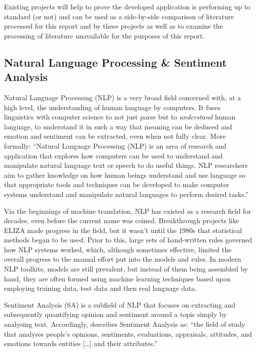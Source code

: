 \documentclass{article}
\begin{document}
        Existing projects will help to prove the developed application is performing up to standard (or not) and can be used as a side-by-side comparison of literature processed for this report and by these projects as well as to examine the processing of literature unavailable for the purposes of this report.
    \subsection{Natural Language Processing \& Sentiment Analysis}
        Natural Language Processing (NLP) is a very broad field concerned with, at a high level, the understanding of human language by computers. It fuses linguistics with computer science to not just parse but to \textit{understand} human language, to understand it in such a way that meaning can be deduced and emotion and sentiment can be extracted, even when not fully clear. More formally: ``Natural Language Processing (NLP) is an area of research and application that explores how computers can be used to understand and manipulate natural language text or speech to do useful things. NLP researchers aim to gather knowledge on how human beings understand and use language so that appropriate tools and techniques can be developed to make computer systems understand and manipulate natural languages to perform desired tasks.'' \citep{chowdhury2003natural}

        Via the beginnings of machine translation, NLP has existed as a research field for decades, even before the current name was coined. Breakthrough projects like ELIZA made progress in the field, but it wasn't until the 1980s that statistical methods began to be used. Prior to this, large sets of hand-written rules governed how NLP systems worked, which, although sometimes effective, limited the overall progress to the manual effort put into the models and rules. In modern NLP toolkits, models are still prevalent, but instead of them being assembled by hand, they are often formed using machine learning techniques based upon employing training data, test data and then real language data.

        Sentiment Analysis (SA) is a subfield of NLP that focuses on extracting and subsequently quantifying opinion and sentiment around a topic simply by analysing text. Accordingly, \cite{liu2012sentiment} describes Sentiment Analysis as: ``the field of study that analyses people’s opinions, sentiments, evaluations, appraisals, attitudes, and emotions towards entities [\dots] and their attributes.''
        
\end{document}
